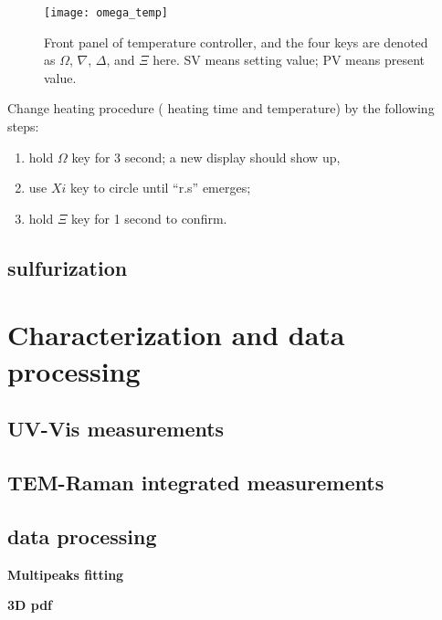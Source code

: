 \begin{figure}[htb]
\centering
\texttt{[image: omega\_temp]}
\caption{Front panel of temperature controller, and the four keys are denoted as $\Omega$, $\nabla$, $\Delta$, and $\Xi$ here. SV means setting value; PV means present value.}
\label{fig:omega}
\end{figure}


Change heating procedure ( heating time and temperature) by the following steps:
\begin{enumerate}
\item hold $\Omega$ key for 3 second; a new display should show up, 
\item use $Xi$ key to circle until ``r.s'' emerges;
\item hold $\Xi$ key for 1 second to confirm.
\end{enumerate}


\subsection{sulfurization}


\section{Characterization and data processing}

\subsection{UV-Vis measurements}


\subsection{TEM-Raman integrated measurements}

\subsection{data processing}

\textbf{Multipeaks fitting}

\textbf{3D pdf} 

\fi



